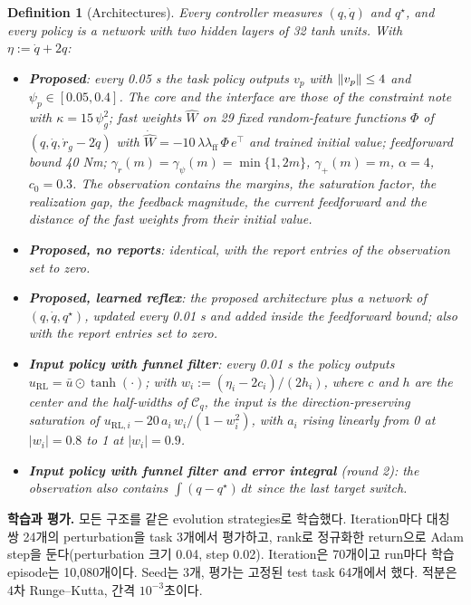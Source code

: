 \documentclass[11pt]{article}\usepackage[margin=1in]{geometry}\usepackage{amsmath,amssymb,amsthm,mathtools}\usepackage{graphicx}\graphicspath{{figures/}{../figures/}{figs/}{./}}\usepackage{enumitem}\usepackage{hyperref}\usepackage{cleveref}\usepackage{tikz}\usetikzlibrary{arrows.meta,positioning,calc,shapes.geometric}\usepackage{float}\usepackage[most]{tcolorbox}\usepackage{kotex}\usepackage{booktabs}\emergencystretch=1.6em\tolerance=2000 \crefname{assumption}{Assumption}{Assumptions}\Crefname{assumption}{Assumption}{Assumptions}\crefname{definition}{Definition}{Definitions}\Crefname{definition}{Definition}{Definitions}\crefname{proposition}{Proposition}{Propositions}\Crefname{proposition}{Proposition}{Propositions}\crefname{fact}{Fact}{Facts}\Crefname{fact}{Fact}{Facts} \newtheorem{assumption}{Assumption}\newtheorem{definition}{Definition}\newtheorem{lemma}{Lemma}\newtheorem{proposition}{Proposition}\newtheorem{theorem}{Theorem}\newtheorem{corollary}{Corollary}\newtheorem{fact}{Fact}\theoremstyle{remark}\newtheorem{remark}{Remark} \newcommand{\R}{\mathbb{R}}\newcommand{\U}{\mathcal U}
\begin{document}
\begin{definition}[Architectures]
\label{def:arch}
Every controller measures $(q,\dot q)$ and $q^\star$, and every policy is a network with two hidden layers of 32 tanh units. With $\eta:=\dot q+2q$:
\begin{itemize}
\item \textbf{\emph{Proposed}}: every 0.05 s the task policy outputs $v_p$ with $\lVert v_p\rVert\le4$ and $\psi_p\in[0.05,0.4]$. The core and the interface are those of the constraint note with $\kappa=15\,\psi_g^2$; fast weights $\hat W$ on 29 fixed random-feature functions $\Phi$ of $(q,\dot q,\dot r_g-2\dot q)$ with $\dot{\hat W}=-10\,\lambda\lambda_{\mathrm{ff}}\,\Phi\,e^\top$ and trained initial value; feedforward bound 40 Nm; $\gamma_r(m)=\gamma_\psi(m)=\min\{1,2m\}$, $\gamma_+(m)=m$, $\alpha=4$, $c_0=0.3$. The observation contains the margins, the saturation factor, the realization gap, the feedback magnitude, the current feedforward and the distance of the fast weights from their initial value.
\item \textbf{\emph{Proposed, no reports}}: identical, with the report entries of the observation set to zero.
\item \textbf{\emph{Proposed, learned reflex}}: the proposed architecture plus a network of $(q,\dot q,q^\star)$, updated every 0.01 s and added inside the feedforward bound; also with the report entries set to zero.
\item \textbf{\emph{Input policy with funnel filter}}: every 0.01 s the policy outputs $u_{\mathrm{RL}}=\bar u\odot\tanh(\cdot)$; with $w_i:=(\eta_i-2c_i)/(2h_i)$, where $c$ and $h$ are the center and the half-widths of $\mathcal C_q$, the input is the direction-preserving saturation of $u_{\mathrm{RL},i}-20\,a_i\,w_i/(1-w_i^2)$, with $a_i$ rising linearly from 0 at $|w_i|=0.8$ to 1 at $|w_i|=0.9$.
\item \textbf{\emph{Input policy with funnel filter and error integral}} (round 2): the observation also contains $\int(q-q^\star)\,dt$ since the last target switch.
\end{itemize}
\end{definition}

\textbf{학습과 평가.} 모든 구조를 같은 evolution strategies로 학습했다. Iteration마다 대칭 쌍 24개의 perturbation을 task 3개에서 평가하고, rank로 정규화한 return으로 Adam step을 둔다(perturbation 크기 0.04, step 0.02). Iteration은 70개이고 run마다 학습 episode는 10,080개이다. Seed는 3개, 평가는 고정된 test task 64개에서 했다. 적분은 4차 Runge--Kutta, 간격 $10^{-3}$초이다.
\end{document}
